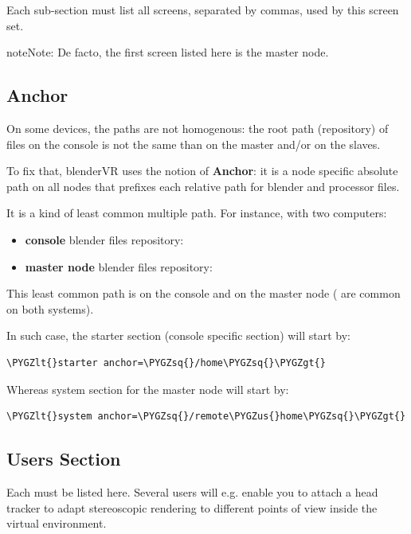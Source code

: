 \documentclass[a4,10pt,openany,oneside]{sphinxmanual}
\def\PYGZus{\char`\_}
\def\PYGZlt{\char`\<}
\def\PYGZgt{\char`\>}
\def\PYGZsq{\char`\'}
\begin{document}
Each  sub-section must list all screens, separated by commas, used by this screen set.

\begin{notice}{note}{Note:}
De facto, the first screen listed here is the master node.
\end{notice}


\subsection{Anchor}
\label{components/configuration-file:anchor}
On some devices, the paths are not homogenous: the root path (repository) of  files on the console is not the same than on the master and/or on the slaves.

To fix that, blenderVR uses the notion of \textbf{Anchor}: it is a node specific absolute path on all nodes that prefixes each relative path for blender and processor files.

It is a kind of least common multiple path. For instance, with two computers:
\begin{itemize}
\item {} 
\textbf{console} blender files repository: 

\item {} 
\textbf{master node} blender files repository: 

\end{itemize}

This least common path is  on the console and  on the master node ( are common on both systems).

In such case, the starter section (console specific section) will start by:

\begin{Verbatim}[commandchars=\\\{\}]
\PYGZlt{}starter anchor=\PYGZsq{}/home\PYGZsq{}\PYGZgt{}
\end{Verbatim}

Whereas system section for the master node will start by:

\begin{Verbatim}[commandchars=\\\{\}]
\PYGZlt{}system anchor=\PYGZsq{}/remote\PYGZus{}home\PYGZsq{}\PYGZgt{}
\end{Verbatim}


\subsection{Users Section}
\label{components/configuration-file:users-section}
Each  must be listed here. Several users will e.g. enable you to attach a head tracker to adapt stereoscopic rendering to different points of view inside the virtual environment.
\end{document}

